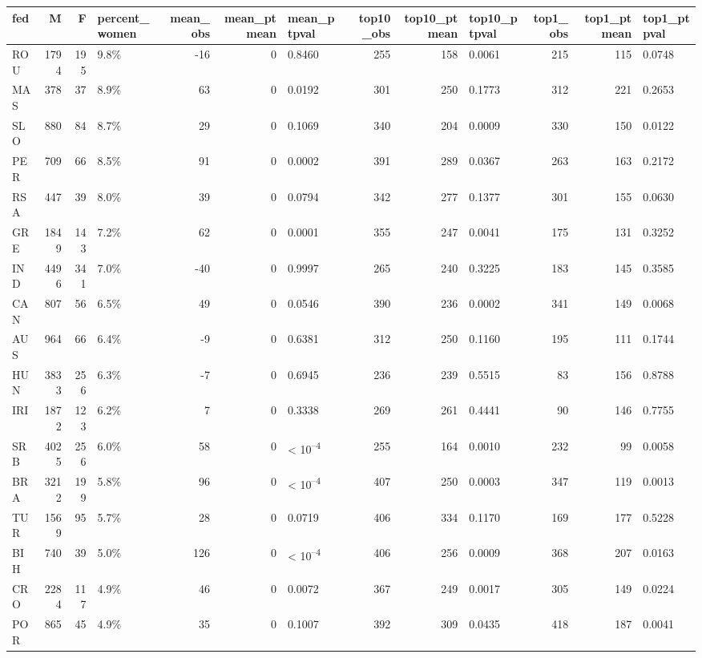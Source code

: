
\begin{tabular}{l|r|r|l|r|r|l|r|r|l|r|r|l}
\hline
fed & M & F & percent_women & mean_obs & mean_ptmean & mean_ptpval & top10_obs & top10_ptmean & top10_ptpval & top1_obs & top1_ptmean & top1_ptpval\\
\hline
ROU & 1794 & 195 & 9.8\% & -16 & 0 & 0.8460 & 255 & 158 & 0.0061 & 215 & 115 & 0.0748\\
\hline
MAS & 378 & 37 & 8.9\% & 63 & 0 & 0.0192 & 301 & 250 & 0.1773 & 312 & 221 & 0.2653\\
\hline
SLO & 880 & 84 & 8.7\% & 29 & 0 & 0.1069 & 340 & 204 & 0.0009 & 330 & 150 & 0.0122\\
\hline
PER & 709 & 66 & 8.5\% & 91 & 0 & 0.0002 & 391 & 289 & 0.0367 & 263 & 163 & 0.2172\\
\hline
RSA & 447 & 39 & 8.0\% & 39 & 0 & 0.0794 & 342 & 277 & 0.1377 & 301 & 155 & 0.0630\\
\hline
GRE & 1849 & 143 & 7.2\% & 62 & 0 & 0.0001 & 355 & 247 & 0.0041 & 175 & 131 & 0.3252\\
\hline
IND & 4496 & 341 & 7.0\% & -40 & 0 & 0.9997 & 265 & 240 & 0.3225 & 183 & 145 & 0.3585\\
\hline
CAN & 807 & 56 & 6.5\% & 49 & 0 & 0.0546 & 390 & 236 & 0.0002 & 341 & 149 & 0.0068\\
\hline
AUS & 964 & 66 & 6.4\% & -9 & 0 & 0.6381 & 312 & 250 & 0.1160 & 195 & 111 & 0.1744\\
\hline
HUN & 3833 & 256 & 6.3\% & -7 & 0 & 0.6945 & 236 & 239 & 0.5515 & 83 & 156 & 0.8788\\
\hline
IRI & 1872 & 123 & 6.2\% & 7 & 0 & 0.3338 & 269 & 261 & 0.4441 & 90 & 146 & 0.7755\\
\hline
SRB & 4025 & 256 & 6.0\% & 58 & 0 & < 10\textsuperscript{--4} & 255 & 164 & 0.0010 & 232 & 99 & 0.0058\\
\hline
BRA & 3212 & 199 & 5.8\% & 96 & 0 & < 10\textsuperscript{--4} & 407 & 250 & 0.0003 & 347 & 119 & 0.0013\\
\hline
TUR & 1569 & 95 & 5.7\% & 28 & 0 & 0.0719 & 406 & 334 & 0.1170 & 169 & 177 & 0.5228\\
\hline
BIH & 740 & 39 & 5.0\% & 126 & 0 & < 10\textsuperscript{--4} & 406 & 256 & 0.0009 & 368 & 207 & 0.0163\\
\hline
CRO & 2284 & 117 & 4.9\% & 46 & 0 & 0.0072 & 367 & 249 & 0.0017 & 305 & 149 & 0.0224\\
\hline
POR & 865 & 45 & 4.9\% & 35 & 0 & 0.1007 & 392 & 309 & 0.0435 & 418 & 187 & 0.0041\\
\hline

\end{tabular}
